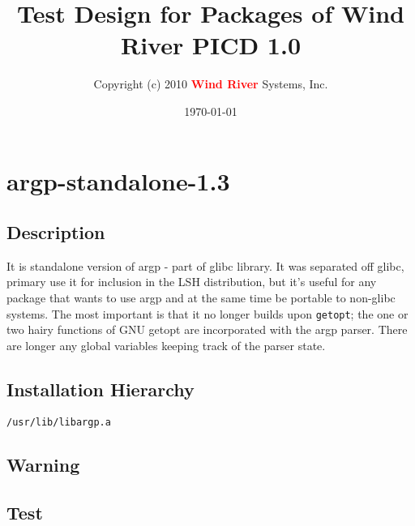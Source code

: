 \documentclass[a4paper]{report}
\title{\textbf{Test Design for Packages of Wind River PICD 1.0}}
\author{Copyright (c) 2010 \textcolor{red}{\textbf{Wind River}} Systems, Inc.}
\date{\today}
\begin{document}
\pagestyle{headings}
\maketitle
\tableofcontents
{}
\hypersetup{
    colorlinks=true, 
    breaklinks=true,
    plainpages=false,
}


\chapter{argp-standalone-1.3}
\section{Description}
It is standalone version of argp - part of glibc library. It was separated off glibc, 
primary use it for inclusion in the LSH distribution, but it's useful for any 
package that wants to use argp and at the same time be portable to non-glibc systems. 
The most important is that it no longer builds upon {\tt getopt}; the one or two hairy 
functions of GNU getopt are incorporated with the argp parser. There are longer 
any global variables keeping track of the parser state.
\section{Installation Hierarchy}
\begin{lstlisting}
/usr/lib/libargp.a
\end{lstlisting}
\section{Warning}
\section{Test}
\end{document}
